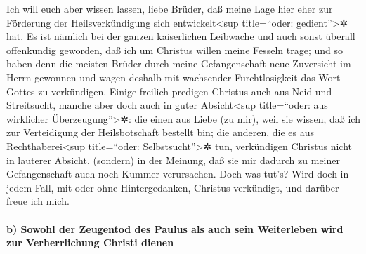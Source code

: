  Ich will euch aber wissen lassen, liebe Brüder, daß
meine Lage hier eher zur Förderung der Heilsverkündigung sich
entwickelt\textless sup title=``oder: gedient''\textgreater✲ hat.
 Es ist nämlich bei der ganzen kaiserlichen Leibwache und
auch sonst überall offenkundig geworden, daß ich um Christus willen
meine Fesseln trage;  und so haben denn die meisten
Brüder durch meine Gefangenschaft neue Zuversicht im Herrn gewonnen und
wagen deshalb mit wachsender Furchtlosigkeit das Wort Gottes zu
verkündigen.  Einige freilich predigen Christus auch aus
Neid und Streitsucht, manche aber doch auch in guter
Absicht\textless sup title=``oder: aus wirklicher
Überzeugung''\textgreater✲:  die einen aus Liebe (zu
mir), weil sie wissen, daß ich zur Verteidigung der Heilsbotschaft
bestellt bin;  die anderen, die es aus
Rechthaberei\textless sup title=``oder: Selbstsucht''\textgreater✲ tun,
verkündigen Christus nicht in lauterer Absicht, (sondern) in der
Meinung, daß sie mir dadurch zu meiner Gefangenschaft auch noch Kummer
verursachen.  Doch was tut's? Wird doch in jedem Fall,
mit oder ohne Hintergedanken, Christus verkündigt, und darüber freue ich
mich.

\hypertarget{b-sowohl-der-zeugentod-des-paulus-als-auch-sein-weiterleben-wird-zur-verherrlichung-christi-dienen}{%
\paragraph{b) Sowohl der Zeugentod des Paulus als auch sein Weiterleben
wird zur Verherrlichung Christi
dienen}\label{b-sowohl-der-zeugentod-des-paulus-als-auch-sein-weiterleben-wird-zur-verherrlichung-christi-dienen}}

